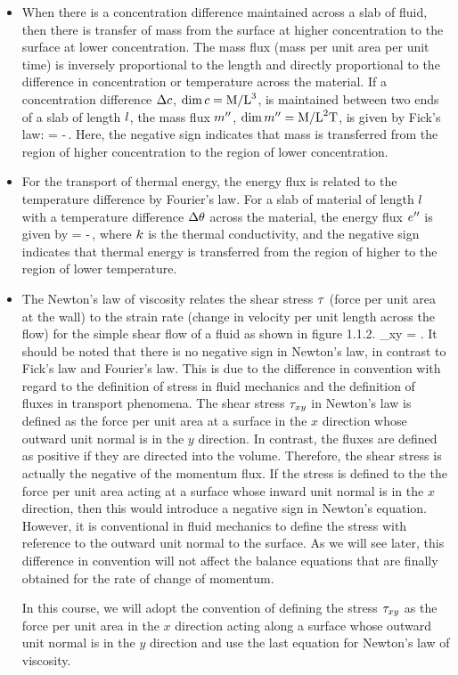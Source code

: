 \begin{itemize}
\item When there is a concentration difference maintained across a slab of fluid, then there is transfer of mass from the surface at higher concentration to the surface at lower concentration. The mass flux (mass per unit area per unit time) is inversely proportional to the length and directly proportional to the difference in concentration or temperature across the material. If a concentration difference $\Delta c$, $\dim c = \text{M}/\text{L}^3$, is maintained between two ends of a slab of length $l$, the mass flux ${m}^{\prime\prime}$, $\dim{m}^{\prime\prime} = \text{M}/\text{L}^2\text{T}$, is given by Fick's law:
\beq
\flux\mass = -\kdiff \dfrac{\Dx\conc}{\length}\,.
\eeq
Here, the negative sign indicates that mass is transferred from the region of higher concentration to the region of lower concentration.
%
\item For the transport of thermal energy, the energy flux is related to the temperature difference by Fourier's law. For a slab of material of length $l$ with a temperature difference $\Delta\theta$ across the material, the energy flux ${e}^{\prime\prime}$ is given by
\beq
\flux\then = -\kthcond\dfrac{\Dx\temp}{\length}\,,
\eeq
where $k$ is the thermal conductivity, and the negative sign indicates that thermal energy is transferred from the region of higher to the region of lower temperature.
%
\item The Newton's law of viscosity relates the shear stress $\tau$ (force per unit area at the wall) to the strain rate (change in velocity per unit length across the flow) for the simple shear flow of a fluid as shown in figure 1.1.2.
\beq
\shear_{xy} = \kinvis{}.
\eeq
It should be noted that there is no negative sign in Newton's law, in contrast to Fick's law and Fourier's law. This is due to the difference in convention with regard to the definition of stress in fluid mechanics and the definition of fluxes in transport phenomena. The shear stress $\tau_{xy}$ in Newton's law is defined as the force per unit area at a surface in the $x$ direction whose outward unit normal is in the $y$ direction. In contrast, the fluxes are defined as positive if they are directed into the volume. Therefore, the shear stress is actually the negative of the momentum flux. If the stress is defined to the the force per unit area acting at a surface whose inward unit normal is in the $x$ direction, then this would introduce a negative sign in Newton's equation. However, it is conventional in fluid mechanics to define the stress with reference to the outward unit normal to the surface. As we will see later, this difference in convention will not affect the balance equations that are finally obtained for the rate of change of momentum.

In this course, we will adopt the convention of defining the stress $\tau_{xy}$ as the force per unit area in the $x$ direction acting along a surface whose outward unit normal is in the $y$ direction and use the last equation for Newton's law of viscosity.
\end{itemize}

